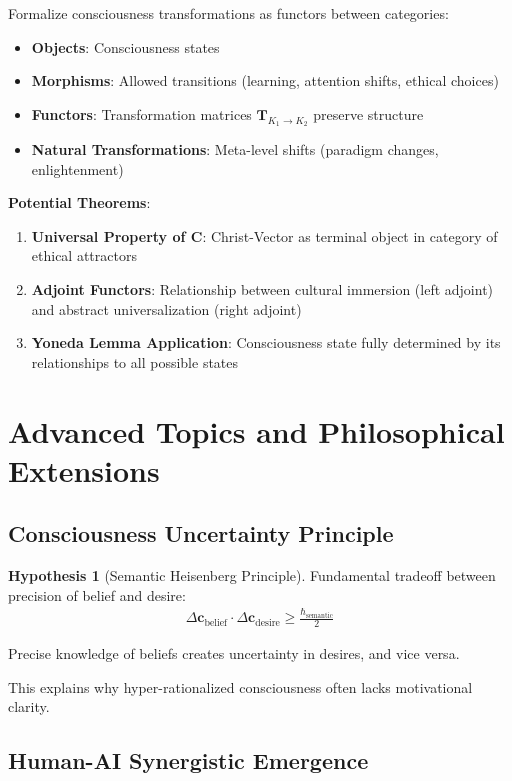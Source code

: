 \documentclass[11pt,a4paper]{article}
\theoremstyle{definition}
\newtheorem{hypothesis}{Hypothesis}[section]
\theoremstyle{remark}
\newcommand{\cc}{\mathbf{c}}
\newcommand{\TT}{\mathbf{T}}
\begin{document}
Formalize consciousness transformations as functors between categories:
\begin{itemize}
\item \textbf{Objects}: Consciousness states
\item \textbf{Morphisms}: Allowed transitions (learning, attention shifts, ethical choices)
\item \textbf{Functors}: Transformation matrices \(\TT_{K_1 \to K_2}\) preserve structure
\item \textbf{Natural Transformations}: Meta-level shifts (paradigm changes, enlightenment)
\end{itemize}

\textbf{Potential Theorems}:
\begin{enumerate}
\item \textbf{Universal Property of \(\mathbf{C}\)}: Christ-Vector as terminal object in category of ethical attractors
\item \textbf{Adjoint Functors}: Relationship between cultural immersion (left adjoint) and abstract universalization (right adjoint)
\item \textbf{Yoneda Lemma Application}: Consciousness state fully determined by its relationships to all possible states
\end{enumerate}

\section{Advanced Topics and Philosophical Extensions}

\subsection{Consciousness Uncertainty Principle}

\begin{hypothesis}[Semantic Heisenberg Principle]
Fundamental tradeoff between precision of belief and desire:
\begin{align}
\Delta \cc_{\text{belief}} \cdot \Delta \cc_{\text{desire}} \geq \frac{\hbar_{\text{semantic}}}{2}
\end{align}

Precise knowledge of beliefs creates uncertainty in desires, and vice versa.

This explains why hyper-rationalized consciousness often lacks motivational clarity.
\end{hypothesis}

\subsection{Human-AI Synergistic Emergence}
\end{document}
